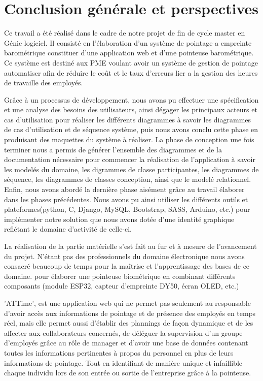 \chapter*{Conclusion générale et perspectives}

Ce travail a été réalisé dans le cadre de notre projet de fin de cycle master en Génie logiciel. Il consisté en l'élaboration d'un système de pointage a empreinte barométrique constituer d'une application web et d'une pointeuse barométrique. Ce système est destiné aux PME voulant avoir un système de gestion de pointage automatiser afin de réduire le coût et le taux d'erreurs lier a la gestion des heures de travaille des employés.

Grâce à un processus de développement, nous avons pu effectuer une spécification et une analyse des besoins des utilisateurs, ainsi dégager les principaux acteurs et cas d'utilisation pour réaliser les différents diagrammes à savoir les diagrammes de cas d'utilisation et de séquence système, puis nous avons conclu cette phase en produisant des maquettes du système à réaliser. La phase de conception une fois terminer nous a permis de générer l'ensemble des diagrammes et de la documentation nécessaire pour commencer la réalisation de l'application à savoir les modelés du domaine,  les digrammes de classe participantes, les diagrammes de séquence, les diagrammes de classes conception, ainsi que le modelé relationnel. Enfin, nous avons abordé la dernière phase aisément grâce au travail élaborer dans les phases précédentes. Nous avons pu ainsi utiliser les différents outils et plateformes(python, C, Django, MySQL,  Bootstrap, SASS, Arduino, etc.) pour implémenter notre solution que nous avons dotée d'une identité graphique reflétant le domaine d'activité de celle-ci.

La réalisation de la partie matérielle s'est fait au fur et à mesure de l'avancement du projet. N’étant pas des professionnels du domaine électronique nous avons consacré beaucoup de temps pour la maîtrise et l'apprentissage des bases de ce domaine. pour élaborer une pointeuse biométrique en combinant différents composants (module ESP32, capteur d'empreinte DY50, écran OLED, etc.)   

'ATTime', est une application web qui ne permet pas seulement au responsable d'avoir accès aux informations de pointage et de présence des employés en temps réel, mais elle permet aussi d'établir des plannings de façon dynamique et de les affecter aux collaborateurs concernés, de déléguer la supervision d'un groupe d'employés grâce au rôle de manager et d'avoir une base de données contenant toutes les informations pertinentes à propos du personnel en plus de leurs informations de pointage. Tout en identifiant de manière unique et infaillible chaque individu lors de son entrée ou sortie de l'entreprise grâce à la pointeuse.   

